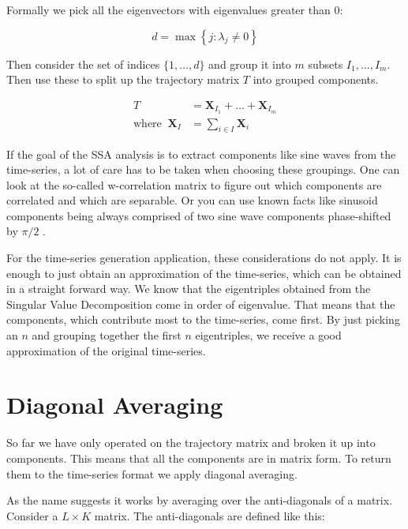 Formally we pick all the eigenvectors with eigenvalues greater than 0:

\begin{equation}
  d=\max \left\{j: \lambda_{j} \neq 0\right\} 
\end{equation}

Then consider the set of indices $\{1, \ldots, d\}$ and group it into $m$ subsets $I_1, \ldots, I_m$. Then use these to split up the trajectory matrix $T$ into grouped components.

\begin{equation}
   \begin{aligned}
      T&=\mathbf{X}_{I_{1}}+\ldots+\mathbf{X}_{I_{m}} \\
      \text{where} \;\; \mathbf{X}_{I}&=\sum_{i \in I} \mathbf{X}_{i}
   \end{aligned}
\end{equation}
  
If the goal of the SSA analysis is to extract components like sine waves from the time-series, a lot of care has to be taken when choosing these groupings. One can look at the so-called w-correlation matrix to figure out which components are correlated and which are separable. Or you can use known facts like sinusoid components being always comprised of two sine wave components phase-shifted by $\pi/2$ \parencite{golyandina2014basic}.

For the time-series generation application, these considerations do not apply. It is enough to just obtain an approximation of the time-series, which can be obtained in a straight forward way. We know that the eigentriples obtained from the Singular Value Decomposition come in order of eigenvalue. That means that the components, which contribute most to the time-series, come first. By just picking an $n$ and grouping together the first $n$ eigentriples, we receive a good approximation of the original time-series.

\section{Diagonal Averaging}

So far we have only operated on the trajectory matrix and broken it up into components. This means that all the components are in matrix form. To return them to the time-series format we apply diagonal averaging. 

As the name suggests it works by averaging over the anti-diagonals of a matrix. Consider a $L\times K$ matrix. The anti-diagonals are defined like this: 

